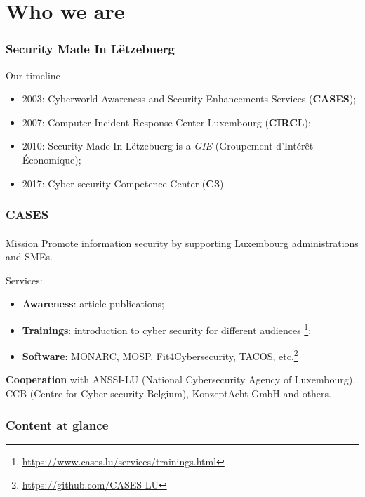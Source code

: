 %
%
\section*{Who we are}
\begin{frame}
  \frametitle{Security Made In Lëtzebuerg}
  Our timeline
  \begin{center}
    \begin{itemize}
      \item 2003: Cyberworld Awareness and Security Enhancements Services (\textbf{CASES});
      \item 2007: Computer Incident Response Center Luxembourg (\textbf{CIRCL});
      \item 2010: Security Made In Lëtzebuerg is a \textit{GIE} (Groupement d’Intérêt Économique);
      \item 2017: Cyber security Competence Center (\textbf{C3}).
    \end{itemize}
  \end{center}
\end{frame}

\begin{frame}
  \frametitle{CASES}
  \framesubtitle{}
  \begin{block}{Mission}
    Promote information security by supporting Luxembourg administrations and SMEs.
  \end{block}
  Services:
  \begin{center}
    \begin{itemize}
      \item \textbf{Awareness}: article publications;
      \item \textbf{Trainings}:
      introduction to cyber security for different audiences
      \footnote{\url{https://www.cases.lu/services/trainings.html}};
      \item \textbf{Software}:
      MONARC, MOSP, Fit4Cybersecurity, TACOS,
      etc.\footnote{\url{https://github.com/CASES-LU}}
    \end{itemize}
  \end{center}
  \textbf{Cooperation} with
  ANSSI-LU (National Cybersecurity Agency of Luxembourg),
  CCB (Centre for Cyber security Belgium), KonzeptAcht GmbH and others.
\end{frame}

\setcounter{tocdepth}{1}
\begin{frame}
  \frametitle{Content at glance}
  \tableofcontents
\end{frame}
\setcounter{tocdepth}{4}

